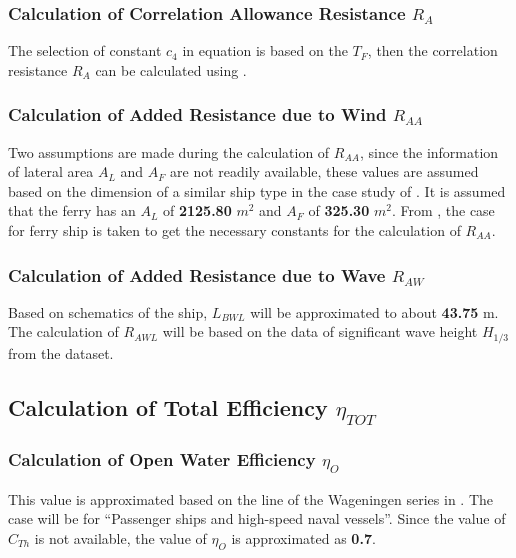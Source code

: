 \subsubsection*{Calculation of Correlation Allowance Resistance $R_A$}

The selection of constant $c_4$ in equation  is based on the $T_F$, then the correlation resistance $R_A$ can be calculated using .

\subsubsection*{Calculation of Added Resistance due to Wind $R_{AA}$}

Two assumptions are made during the calculation of $R_{AA}$, since the information of lateral area $A_L$ and $A_F$ are not readily available, these values are assumed based on the dimension of a similar ship type in the case study of . It is assumed that the ferry has an $A_L$ of \textbf{2125.80} $m^2$ and $A_F$ of \textbf{325.30} $m^2$. From , the case for ferry ship is taken to get the necessary constants for the calculation of $R_{AA}$. 

\subsubsection*{Calculation of Added Resistance due to Wave $R_{AW}$ }

Based on schematics of the ship, $L_{BWL}$ will be approximated to about \textbf{43.75} m. The calculation of $R_{AWL}$ will be based on the data of significant wave height $H_{1/3}$ from the dataset.

\pagebreak

\subsection{Calculation of Total Efficiency $\eta_{TOT}$}\label{sec:eta_tot_method}

\subsubsection*{Calculation of Open Water Efficiency $\eta_O$}

This value is approximated based on the line of the Wageningen series in  . The case will be for ``Passenger ships and high-speed naval vessels''. Since the value of $C_{Th}$ is not available, the value of $\eta_O$ is approximated as \textbf{0.7}.

